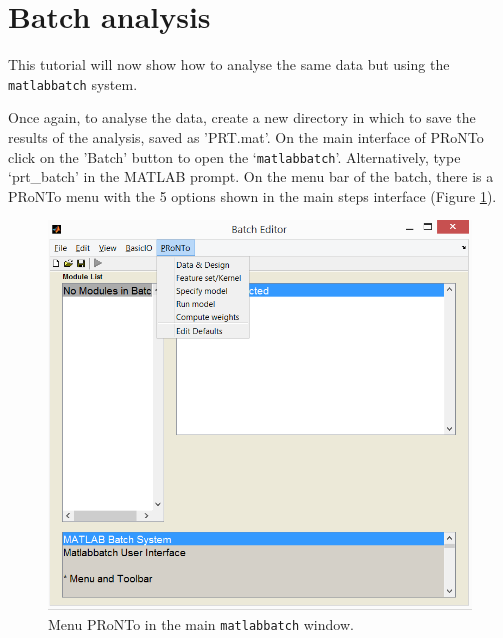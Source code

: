 



\section{Batch analysis}
\label{sec:Batch_analysis}

This tutorial will now show how to analyse the same data but using the {\tt matlabbatch} system.

Once again, to analyse the data, create a new directory in which to save the results of the analysis, saved as 'PRT.mat'. On the main interface of PRoNTo click on the 'Batch' button to open the `{\tt matlabbatch}'. Alternatively, type `prt\_batch' in the MATLAB prompt. On the menu bar of the batch, there is a PRoNTo menu with the 5 options shown in the main steps interface (Figure \ref{fig:batchmkl}).

\begin{figure}[!h]
	\centering
		\includegraphics[scale=0.6]{images/Tutorial/mkl/batchmkl.png}
	\caption{Menu PRoNTo in the main {\tt matlabbatch} window.}
	\label{fig:batchmkl}
\end{figure}


